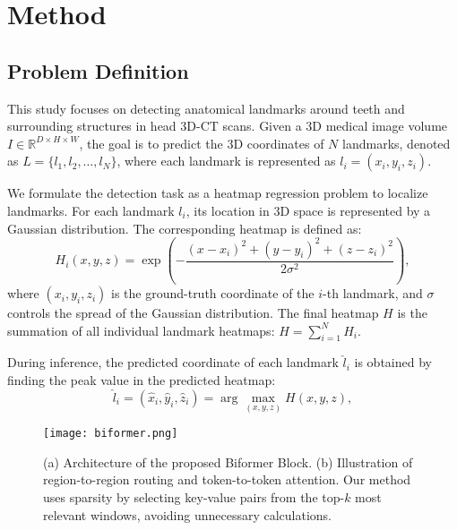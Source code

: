 

\section{Method}\label{Sec.3}

\subsection{Problem Definition}
This study focuses on detecting anatomical landmarks around teeth and surrounding structures in head 3D-CT scans. Given a 3D medical image volume \( I \in \mathbb{R}^{D \times H \times W} \), the goal is to predict the 3D coordinates of \( N \) landmarks, denoted as \( L = \{l_1, l_2, \ldots, l_N\} \), where each landmark is represented as \( l_i = (x_i, y_i, z_i) \).



We formulate the detection task as a heatmap regression problem to localize landmarks. For each landmark \( l_i \), its location in 3D space is represented by a Gaussian distribution. The corresponding heatmap is defined as:
\begin{equation}
H_i(x, y, z) = \exp\left(-\frac{(x - x_i)^2 + (y - y_i)^2 + (z - z_i)^2}{2\sigma^2}\right),
\end{equation}
where \( (x_i, y_i, z_i) \) is the ground-truth coordinate of the \( i \)-th landmark, and \( \sigma \) controls the spread of the Gaussian distribution. The final heatmap \( H \) is the summation of all individual landmark heatmaps: \( H = \sum_{i=1}^{N} H_i. \)

During inference, the predicted coordinate of each landmark \( \hat{l}_i \) is obtained by finding the peak value in the predicted heatmap:
\begin{equation}
\hat{l}_i = (\hat{x}_i, \hat{y}_i, \hat{z}_i) = \arg\max_{(x, y, z)} H(x, y, z),
\end{equation}



\begin{figure}[htbp]
\centering
\texttt{[image: biformer.png]}
\caption{(a) Architecture of the proposed Biformer Block. (b) Illustration of region-to-region routing and token-to-token attention. Our method uses sparsity by selecting key-value pairs from the top-$k$ most relevant windows, avoiding unnecessary calculations.}
\label{fig:biformer}
\end{figure}



